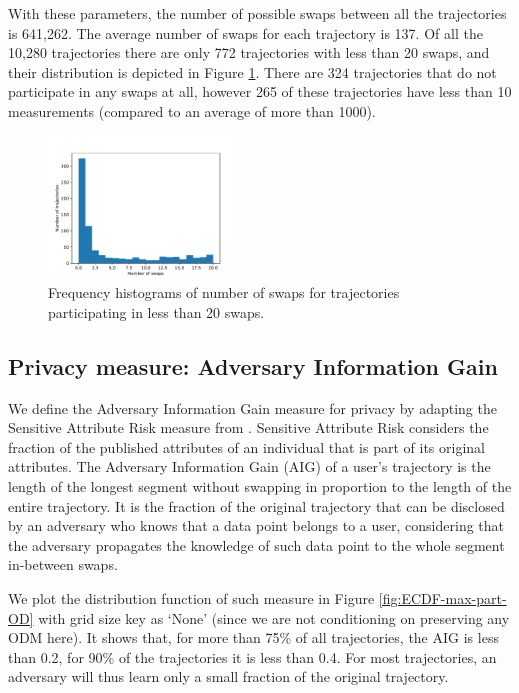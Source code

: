 \documentclass[times,twocolumn,final,authoryear]{elsarticle}
\begin{document}
With these parameters, the number of possible swaps between all the
trajectories is 641,262. The average number of swaps for each
trajectory is 137. Of all the 10,280 trajectories there are only 772 trajectories with less than 20 swaps, and their distribution is depicted in Figure
\ref{fig:swaps-distribution}. There are 324 trajectories that do not
participate in any swaps at all, however 265 of these trajectories
have less than 10 measurements (compared to an average of more than
1000). 

\begin{figure}

    \includegraphics[width=0.45\textwidth]{figures/swaps-distribution-20.pdf}

  \caption{Frequency histograms of number of swaps for trajectories participating in less than 20 swaps.}
  \label{fig:swaps-distribution}%
\end{figure}


\subsection{Privacy measure: Adversary Information Gain}\label{Sec:InfoGain}
 
We define the Adversary Information Gain measure for privacy by adapting the Sensitive Attribute Risk measure from \cite{Salas:2019}. Sensitive Attribute Risk considers the fraction of the published attributes of an individual that is part of its original attributes. 
{\color{blue}
The Adversary Information Gain (AIG) of a user's trajectory is the length of the longest segment without swapping in proportion to the length of the entire trajectory. It is the fraction of the original trajectory that can be disclosed by an adversary who knows that a data point belongs to a user, considering that the adversary propagates the knowledge of such data point to the whole segment in-between swaps. 
}

We plot the distribution function of such measure in Figure \ref{fig:ECDF-max-part-OD} with grid size key as `None' (since we are not conditioning on preserving any ODM here). 
It shows that, for more than 75\% of all
trajectories, the AIG is less than 0.2, for 90\% of the trajectories it is less
than 0.4. For most trajectories, an adversary will thus learn only a
small fraction of the original trajectory. 
\end{document}
